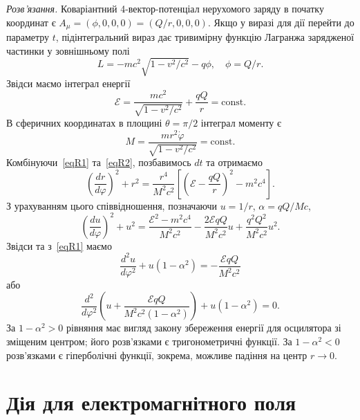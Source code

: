 \textit{Розв'язання.} Коваріантний 4-вектор-потенціал нерухомого заряду в початку координат є $A_\mu = (\phi, 0, 0, 0) = (Q/r, 0, 0, 0)$. Якщо у виразі для дії перейти до параметру $t$, підінтегральний вираз дає тривимірну функцію Лагранжа зарядженої частинки у зовнішньому полі
\begin{equation*}
L = -mc^2 \sqrt{1 - v^2/c^2} - q\phi, \quad \phi = Q/r.
\end{equation*}
Звідси маємо інтеграл енергії
\begin{equation}\label{eqR1}
\mathcal{E} = \frac{mc^2}{\sqrt{1 - v^2/c^2}} + \frac{qQ}{r} = \text{const}.
\end{equation}
В сферичних координатах в площині $\theta = \pi/2$ інтеграл моменту є
\begin{equation}\label{eqR2}
M = \frac{mr^2 \dot{\varphi}}{\sqrt{1 - v^2/c^2}} = \text{const}.
\end{equation}
Комбінуючи~\eqref{eqR1} та~\eqref{eqR2}, позбавимось $dt$ та отримаємо
\begin{equation}\label{eqR3}
\left( \frac{dr}{d\varphi} \right)^2 + r^2 = \frac{r^4}{M^2 c^2} \left[ \left( \mathcal{E} - \frac{qQ}{r} \right)^2 - m^2 c^4 \right].
\end{equation}
З урахуванням цього співвідношення, позначаючи $u = 1/r$, $\alpha = qQ/Mc$,
\begin{equation*}
\left( \frac{du}{d\varphi} \right)^2 + u^2 = \frac{\mathcal{E}^2 - m^2 c^4}{M^2 c^2} - \frac{2\mathcal{E} qQ}{M^2 c^2} u + \frac{q^2 Q^2}{M^2 c^2} u^2.
\end{equation*}
Звідси та з~\eqref{eqR1} маємо
\begin{equation*}
\frac{d^2 u}{d\varphi^2} + u (1 - \alpha^2) = -\frac{\mathcal{E} qQ}{M^2 c^2}
\end{equation*}
або
\begin{equation*}
\frac{d^2}{d\varphi^2} \left( u + \frac{\mathcal{E} qQ}{M^2 c^2 (1 - \alpha^2)} \right) + u (1 - \alpha^2) = 0.
\end{equation*}
За $1 - \alpha^2 > 0$ рівняння має вигляд закону збереження енергії для осцилятора зі зміщеним центром; його розв'язками є тригонометричні функції. За $1 - \alpha^2 < 0$ розв'язками є гіперболічні функції, зокрема, можливе падіння на центр $r \to 0$.

\section{Дія для електромагнітного поля}

